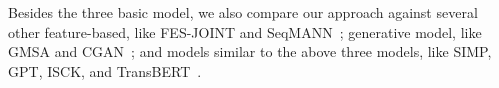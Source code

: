 Besides the three basic model, we also compare our approach against
several other feature-based, like FES-JOINT and SeqMANN~\cite{peng2017joint,li2018multi};
generative model, like GMSA and CGAN~\cite{guan2018story,wang2017conditional}; and  
models similar to the above three models, like SIMP, GPT, ISCK, and TransBERT~\cite{srinivasan2018simple,radford2018improving,chen2018incorporating,li2019story}.










